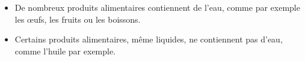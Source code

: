 \documentclass[xcolor={dvipsnames}]{beamer}
\begin{document}
\begin{frame}
\begin{alertblock}
	
	\begin{itemize}
		\item De nombreux produits alimentaires contiennent de l'eau, comme par exemple les \oe ufs, les fruits ou les boissons.
		\item Certains produits alimentaires, même liquides, ne contiennent pas d'eau, comme l'huile par exemple.
	\end{itemize}
	
	
	
\end{alertblock}

\end{frame}
%	
%
%
%	
%


%
%	
%
%
%	
%
%
%	
%
%
%	
%
%
%	
%
%
%	
\end{document}
